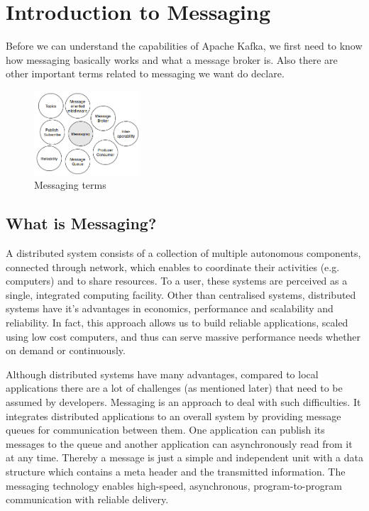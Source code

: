 \chapter{Introduction to Messaging} 

Before we can understand the capabilities of Apache Kafka, we first need to
know how messaging basically works and what a message broker is. Also there are other
important terms related to messaging we want do declare. 

\begin{figure}[H]
    \centering
    \includegraphics[width=0.35\textwidth]{images/messaging-intro.png}
    \caption{Messaging terms}
    \label{fig:MBig:the-log}
\end{figure}

\section{What is Messaging?}
A distributed system consists of a collection of multiple autonomous components,
connected through network, which enables to coordinate  their activities (e.g.
computers) and to share resources. To a user, these systems are perceived as a
single, integrated computing facility. Other than centralised systems,
distributed systems have it's advantages in economics, performance and
scalability and reliability. In fact, this approach allows us to build reliable
applications, scaled using low cost computers, and thus can serve massive
performance needs whether on demand or continuously.\cite{POSA1}\cite{TAN06}

Although distributed systems have many advantages, compared to local
applications there are a lot of challenges (as mentioned later) that need to be
assumed by developers. Messaging is an approach to deal with such difficulties.
It integrates distributed applications to an overall system by providing message
queues for communication between them. One application can publish its messages
to the queue and another application can asynchronously read from it at any time.
Thereby a message is just a simple and independent unit with a data structure
which contains a meta header and the transmitted information. The messaging
technology enables high-speed, asynchronous, program-to-program communication
with reliable delivery.

